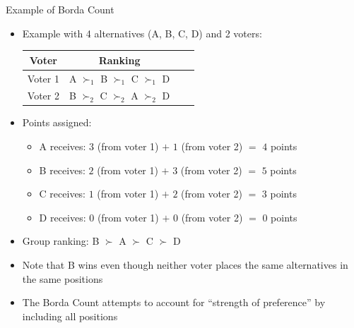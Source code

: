 \documentclass[10pt]{beamer}
\begin{document}
\begin{frame}{Example of Borda Count}
  \begin{itemize}
    \item Example with 4 alternatives (A, B, C, D) and 2 voters:
      \begin{table}
        \center
        \begin{tabular}{cccc}
          \toprule
          \textbf{Voter} & \textbf{Ranking} \\
          \midrule
          Voter 1 & A $\succ_1$ B $\succ_1$ C $\succ_1$ D \\
          Voter 2 & B $\succ_2$ C $\succ_2$ A $\succ_2$ D \\
          \bottomrule
        \end{tabular}
      \end{table}
    \item Points assigned:
      \begin{itemize}
        \item A receives: $3$ (from voter 1) $+$ $1$ (from voter 2) $=$ $4$ points
        \item B receives: $2$ (from voter 1) $+$ $3$ (from voter 2) $=$ $5$ points
        \item C receives: $1$ (from voter 1) $+$ $2$ (from voter 2) $=$ $3$ points
        \item D receives: $0$ (from voter 1) $+$ $0$ (from voter 2) $=$ $0$ points
      \end{itemize}
    \item Group ranking: B $\succ$ A $\succ$ C $\succ$ D
    \item Note that B wins even though neither voter places the same alternatives in the same positions
    \item The Borda Count attempts to account for ``strength of preference'' by including all positions
  \end{itemize}
\end{frame}
\end{document}
